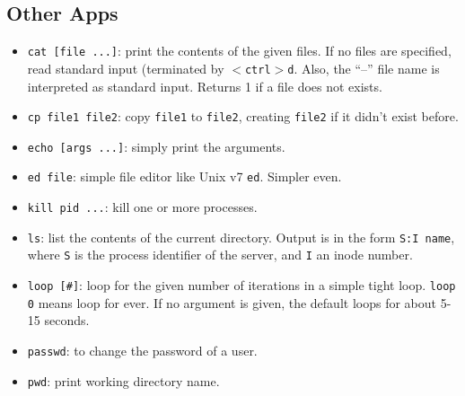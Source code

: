 \documentclass{article}
\begin{document}
\subsection{Other Apps}

\begin{itemize}
\item \texttt{cat [file ...]}: print the contents of the given files.
If no files are specified, read standard input (terminated by
\texttt{$<$ctrl$>$d}.  Also, the ``--'' file name is interpreted
as standard input.  Returns 1 if a file does not exists.
\item \texttt{cp file1 file2}: copy \texttt{file1} to \texttt{file2},
creating \texttt{file2} if it didn't exist before.
\item \texttt{echo [args ...]}: simply print the arguments.
\item \texttt{ed file}: simple file editor like Unix v7 \texttt{ed}.  Simpler even.
\item \texttt{kill pid ...}: kill one or more processes.
\item \texttt{ls}: list the contents of the current directory.
Output is in the form \texttt{S:I name}, where \texttt{S} is the
process identifier of the server, and \texttt{I} an inode number.
\item \texttt{loop [\#]}: loop for the given number of iterations in a
simple tight loop.  \texttt{loop 0} means loop for ever.  If no argument
is given, the default loops for about 5-15 seconds.
\item \texttt{passwd}: to change the password of a user.
\item \texttt{pwd}: print working directory name.
\end{itemize}
\end{document}

